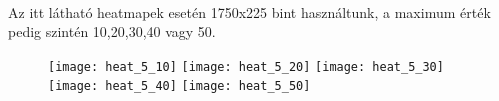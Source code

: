 	\paragraph{}
	Az itt látható heatmapek esetén 1750x225 bint használtunk, a maximum érték pedig szintén 10,20,30,40 vagy 50. 
	\begin{figure}[h]
		\begin{multicols}{2}
			\texttt{[image: heat\_5\_10]}
			\texttt{[image: heat\_5\_20]}
			\texttt{[image: heat\_5\_30]}
			\texttt{[image: heat\_5\_40]}
			\texttt{[image: heat\_5\_50]}		
		\end{multicols}
	\end{figure}